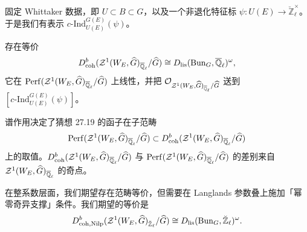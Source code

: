 固定 Whittaker 数据，即 $U\subset B\subset G$，以及一个非退化特征标 $\psi\colon U(E)\to\breve{\mathbb Z}_\ell^\times$。于是我们有表示 $c\text{-}\mathrm{Ind}_{U(E)}^{G(E)}(\psi)$。

\begin{conjecture}
存在等价
\[
D^b_{\mathrm{coh}}(\mathcal{Z}^1(W_E,\widehat G)_{\overline{\mathbb Q}_\ell}/\widehat G)\cong D_{\mathrm{lis}}(\mathrm{Bun}_G,\overline{\mathbb Q}_\ell)^\omega,
\]
它在 $\mathrm{Perf}(\mathcal{Z}^1(W_E,\widehat G)_{\overline{\mathbb Q}_\ell}/\widehat G)$ 上线性，并把 $\mathcal O_{\mathcal{Z}^1(W_E,\widehat G)_{\overline{\mathbb Q}_\ell}/\widehat G}$ 送到 $[c\text{-}\mathrm{Ind}_{U(E)}^{G(E)}(\psi)]$。
\end{conjecture}

\begin{remark}
谱作用决定了猜想 27.19 的函子在子范畴
\[
\mathrm{Perf}(\mathcal{Z}^1(W_E,\widehat G)_{\overline{\mathbb Q}_\ell}/\widehat G)\subset D^b_{\mathrm{coh}}(\mathcal{Z}^1(W_E,\widehat G)_{\overline{\mathbb Q}_\ell}/\widehat G)
\]
上的取值。$D^b_{\mathrm{coh}}(\mathcal{Z}^1(W_E,\widehat G)_{\overline{\mathbb Q}_\ell}/\widehat G)$ 与 $\mathrm{Perf}(\mathcal{Z}^1(W_E,\widehat G)_{\overline{\mathbb Q}_\ell}/\widehat G)$ 的差别来自 $\mathcal{Z}^1(W_E,\widehat G)_{\overline{\mathbb Q}_\ell}$ 的奇点。
\end{remark}

\begin{remark}
在整系数层面，我们期望存在范畴等价，但需要在 Langlands 参数叠上施加「幂零奇异支撑」条件。我们期望的等价是
\[
D^b_{\mathrm{coh},\mathrm{Nilp}}(\mathcal{Z}^1(W_E,\widehat G)_{\breve{\mathbb Z}_\ell}/\widehat G)\cong D_{\mathrm{lis}}(\mathrm{Bun}_G,\breve{\mathbb Z}_\ell)^\omega.
\]
\end{remark}
